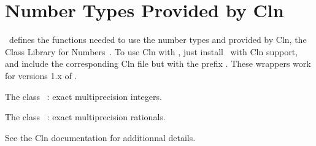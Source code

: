 \section{Number Types Provided by {\sc Cln}}
\label{CLN}


\cgal\ defines the functions needed to use the number types 
and  provided by {\sc Cln}, the Class Library for
Numbers~\cite{cln}.  To use {\sc Cln} with \cgal, just install \cgal\ with
{\sc Cln} support, and include the corresponding {\sc Cln} file but with the
prefix .  These wrappers work for versions 1.x of .


The class ~: exact multiprecision integers.


The class ~: exact multiprecision rationals.

See the {\sc Cln} documentation for additionnal details.
